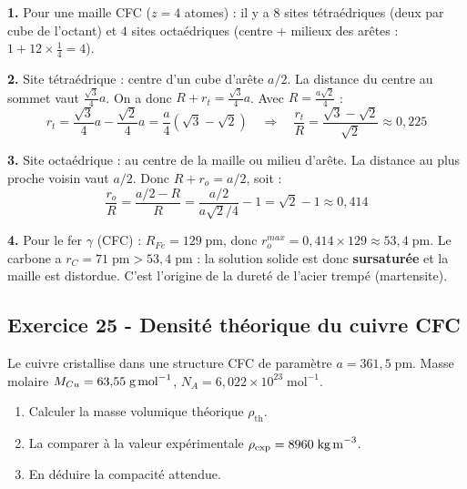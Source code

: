 \documentclass[12pt,a4paper]{article}
\begin{document}
\begin{boitecorrige}
\textbf{1.} Pour une maille CFC ($z=4$ atomes) : il y a $8$ sites tétraédriques (deux par cube de l'octant) et $4$ sites octaédriques (centre + milieux des arêtes : $1 + 12\times \tfrac{1}{4} = 4$).

\textbf{2.} Site tétraédrique : centre d'un cube d'arête $a/2$. La distance du centre au sommet vaut $\frac{\sqrt{3}}{4}a$. On a donc $R + r_t = \frac{\sqrt{3}}{4}a$. Avec $R = \frac{a\sqrt{2}}{4}$ :
\[
r_t = \frac{\sqrt{3}}{4}a - \frac{\sqrt{2}}{4}a = \frac{a}{4}(\sqrt{3}-\sqrt{2})
\quad\Rightarrow\quad \frac{r_t}{R} = \frac{\sqrt{3}-\sqrt{2}}{\sqrt{2}} \approx 0{,}225
\]

\textbf{3.} Site octaédrique : au centre de la maille ou milieu d'arête. La distance au plus proche voisin vaut $a/2$. Donc $R + r_o = a/2$, soit :
\[
\frac{r_o}{R} = \frac{a/2 - R}{R} = \frac{a/2}{a\sqrt{2}/4} - 1 = \sqrt{2} - 1 \approx 0{,}414
\]

\textbf{4.} Pour le fer $\gamma$ (CFC) : $R_{Fe} = 129\;\text{pm}$, donc $r_o^{max} = 0{,}414 \times 129 \approx 53{,}4\;\text{pm}$. Le carbone a $r_C = 71\;\text{pm} > 53{,}4\;\text{pm}$ : la solution solide est donc \textbf{ sursaturée} et la maille est distordue. C'est l'origine de la dureté de l'acier trempé (martensite).
\end{boitecorrige}

\subsection*{Exercice 25 - Densité théorique du cuivre CFC \niveau{\facile}}

\begin{boiteexercice}
Le cuivre cristallise dans une structure CFC de paramètre $a = 361{,}5\;\text{pm}$. Masse molaire $M_{Cu} = 63{,}55\;\text{g\,mol}^{-1}$, $N_A = 6{,}022\times10^{23}\;\text{mol}^{-1}$.
\begin{enumerate}
  \item Calculer la masse volumique théorique $\rho_\text{th}$.
  \item La comparer à la valeur expérimentale $\rho_\text{exp} = 8960\;\text{kg\,m}^{-3}$.
  \item En déduire la compacité attendue.
\end{enumerate}
\end{boiteexercice}
\end{document}
